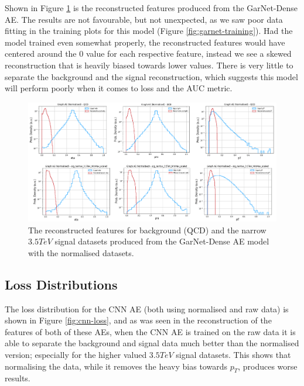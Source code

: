 \documentclass[a4paper]{article}
\theoremstyle{plain}
\theoremstyle{definition}
\begin{document}
			Shown in Figure \ref{fig:garnet-reconstruction} is the reconstructed features produced from the GarNet-Dense AE. The results are not favourable, but not unexpected, as we saw poor data fitting in the training plots for this model (Figure \ref{fig:garnet-training}). Had the model trained even somewhat properly, the reconstructed features would have centered around the 0 value for each respective feature, instead we see a skewed reconstruction that is heavily biased towards lower values. There is very little to separate the background and the signal reconstruction, which suggests this model will perform poorly when it comes to loss and the AUC metric. 

    		\begin{figure}[H]
				\centering
				\begin{minipage}[b]{\linewidth}
					\centering
					\includegraphics[width=\textwidth]{garnet.png}
					\caption{The reconstructed features for background (QCD) and the narrow $3.5 TeV$ signal datasets produced from the GarNet-Dense AE model with the normalised datasets.}
					\label{fig:garnet-reconstruction}
				\end{minipage}
			\end{figure}

		\subsection{Loss Distributions}

			The loss distribution for the CNN AE (both using normalised and raw data) is shown in Figure \ref{fig:cnn-loss}, and as was seen in the reconstruction of the features of both of these AEs, when the CNN AE is trained on the raw data it is able to separate the background and signal data much better than the normalised version; especially for the higher valued $3.5  TeV$ signal datasets. This shows that normalising the data, while it removes the heavy bias towards $p_T$, produces worse results. 
\end{document}
